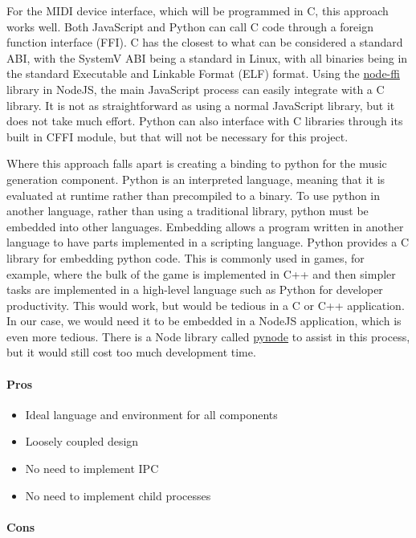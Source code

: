 For the MIDI device interface, which will be programmed in C, this approach works well.
Both JavaScript and Python can call C code through a foreign function interface (FFI). C
has the closest to what can be considered a standard ABI, with the SystemV ABI being a
standard in Linux, with all binaries being in the standard Executable and Linkable Format
(ELF) format. Using the \url{node-ffi} library in NodeJS, the main JavaScript process can
easily integrate with a C library. It is not as straightforward as using a normal
JavaScript library, but it does not take much effort. Python can also interface with C
libraries through its built in CFFI module, but that will not be necessary for this
project.

Where this approach falls apart is creating a binding to python for the music generation
component. Python is an interpreted language, meaning that it is evaluated at runtime
rather than precompiled to a binary. To use python in another language, rather than using
a traditional library, python must be embedded into other languages. Embedding allows a
program written in another language to have parts implemented in a scripting language.
Python provides a C library for embedding python code. This is commonly used in games, for
example, where the bulk of the game is implemented in C++ and then simpler tasks are
implemented in a high-level language such as Python for developer productivity. This would
work, but would be tedious in a C or C++ application. In our case, we would need it to be
embedded in a NodeJS application, which is even more tedious. There is a Node library
called \url{pynode} to assist in this process, but it would still cost too much
development time.

\paragraph{Pros}

\begin{itemize}
  \item Ideal language and environment for all components
  \item Loosely coupled design
  \item No need to implement IPC
  \item No need to implement child processes
\end{itemize}

\paragraph{Cons}

